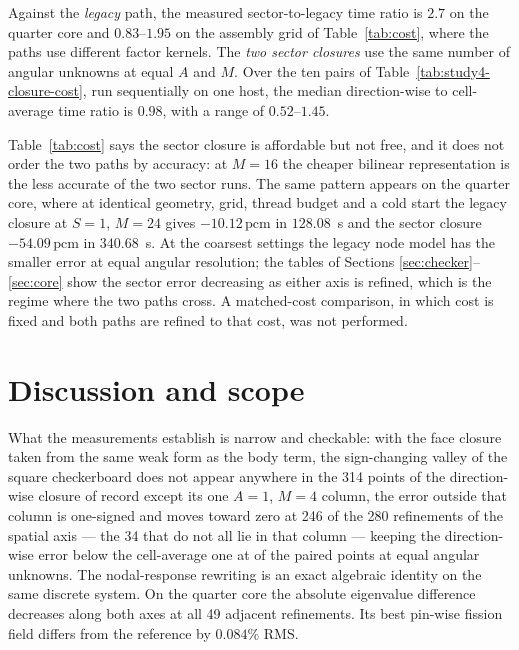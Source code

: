\documentclass[11pt,a4paper]{article}
\newcommand{\pcm}{\,\mathrm{pcm}}
\begin{document}
Against the \emph{legacy} path, the measured sector-to-legacy time ratio is $2.7$ on
the quarter core and $0.83$--$1.95$ on the assembly grid of Table~\ref{tab:cost}, where
the paths use different factor kernels. The \emph{two sector closures} use the same
number of angular unknowns at equal $A$ and $M$. Over the ten pairs of
Table~\ref{tab:study4-closure-cost}, run sequentially on one host, the median
direction-wise to cell-average time ratio is $0.98$, with a range of $0.52$--$1.45$.

Table~\ref{tab:cost} says the sector closure is affordable but not free, and it does
not order the two paths by accuracy: at $M{=}16$ the cheaper bilinear representation
is the less accurate of the two sector runs. The same pattern appears on the quarter
core, where at identical geometry, grid, thread budget and a cold start the legacy
closure at $S{=}1$, $M{=}24$ gives $-10.12\pcm$ in $128.08$~s and the sector closure
$-54.09\pcm$ in $340.68$~s. At the coarsest settings the legacy node model has the
smaller error at equal angular resolution; the tables of Sections
\ref{sec:checker}--\ref{sec:core} show the sector error decreasing as either axis is
refined, which is the regime where the two paths cross. A matched-cost comparison, in
which cost is fixed and both paths are refined to that cost, was not performed.

\section{Discussion and scope}
\label{sec:scope}

What the measurements establish is narrow and checkable: with the face closure taken
from the same weak form as the body term, the sign-changing valley of the square
checkerboard does not appear anywhere in the 314 points of the direction-wise closure of
record except its one $A{=}1$, $M{=}4$ column, the error outside that column is
one-signed and moves toward zero at 246 of the 280 refinements of the spatial axis ---
the 34 that do not all lie in that column --- keeping the
direction-wise error below the cell-average one at \StudyFourSmaller{} of the \StudyFourPairs{} paired points at equal
angular unknowns. The nodal-response rewriting is an exact algebraic identity
on the same discrete system.
On the quarter core the absolute eigenvalue difference decreases along both axes at
all 49 adjacent refinements. Its best pin-wise fission field differs from the reference
by $0.084\%$ RMS.
\end{document}
